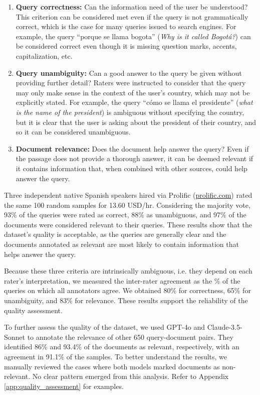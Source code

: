 \documentclass[11pt]{article}
\begin{document}
\begin{enumerate}[wide, itemindent=\labelsep, itemsep=0pt]
  \item \textbf{Query correctness:} Can the information need of the user be understood? This criterion can be considered met even if the query is not grammatically correct, which is the case for many queries issued to search engines. For example, the query ``porque se llama bogota'' (\emph{Why is it called Bogotá?}) can be considered correct even though it is missing question marks, accents, capitalization, etc.

  \item \textbf{Query unambiguity:} Can a good answer to the query be given without providing further detail? Raters were instructed to consider that the query may only make sense in the context of the user's country, which may not be explicitly stated. For example, the query ``cómo se llama el presidente'' (\emph{what is the name of the president}) is ambiguous without specifying the country, but it is clear that the user is asking about the president of their country, and so it can be considered unambiguous.

  \item \textbf{Document relevance:} Does the document help answer the query? Even if the passage does not provide a thorough answer, it can be deemed relevant if it contains information that, when combined with other sources, could help answer the query.
\end{enumerate}


Three independent native Spanish speakers hired via Prolific (\href{https://www.prolific.com/}{prolific.com}) rated the same 100 random samples for 13.60 USD/hr. Considering the majority vote, 93\% of the queries were rated as correct, 88\% as unambiguous, and 97\% of the documents were considered relevant to their queries. These results show that the dataset's quality is acceptable, as the queries are generally clear and the documents annotated as relevant are most likely to contain information that helps answer the query.

Because these three criteria are intrinsically ambiguous, i.e. they depend on each rater's interpretation, we measured the inter-rater agreement as the \% of the queries on which all annotators agree. We obtained 80\% for correctness, 65\% for unambiguity, and 83\% for relevance. These results support the reliability of the quality assessment.

To further assess the quality of the dataset, we used GPT-4o and Claude-3.5-Sonnet to annotate the relevance of other 650 query-document pairs. They identified 86\% and 93.4\% of the documents as relevant, respectively, with an agreement in 91.1\% of the samples. To better understand the results, we manually reviewed the cases where both models marked documents as non-relevant. No clear pattern emerged from this analysis. Refer to Appendix \ref{app:quality_assessment} for examples.
\end{document}

